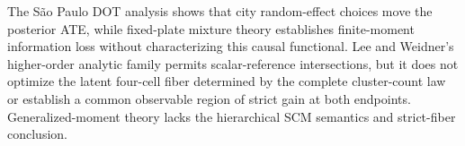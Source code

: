 The S\~ao Paulo DOT analysis shows that city random-effect choices move the posterior ATE, while fixed-plate mixture theory establishes finite-moment information loss without characterizing this causal functional. Lee and Weidner's higher-order analytic family permits scalar-reference intersections, but it does not optimize the latent four-cell fiber determined by the complete cluster-count law or establish a common observable region of strict gain at both endpoints. Generalized-moment theory lacks the hierarchical SCM semantics and strict-fiber conclusion.